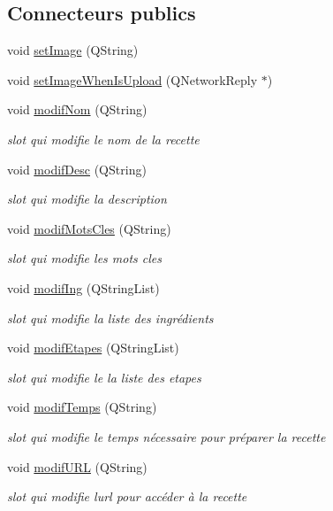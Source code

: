 \subsection*{Connecteurs publics}
\begin{DoxyCompactItemize}
\item 
void \hyperlink{classMainWindow_aaddccbd976fda27cf2d17b9f43dbc486}{set\+Image} (Q\+String)
\item 
void \hyperlink{classMainWindow_ae58368ff237b1f298381a0aeaf8e7290}{set\+Image\+When\+Is\+Upload} (Q\+Network\+Reply $\ast$)
\item 
void \hyperlink{classMainWindow_ac154b320efe8998a85a93f1c41ace7e4}{modif\+Nom} (Q\+String)
\begin{DoxyCompactList}\small\item\em slot qui modifie le nom de la recette \end{DoxyCompactList}\item 
void \hyperlink{classMainWindow_a77ada7a541d869ea7f3647900ba6f6df}{modif\+Desc} (Q\+String)
\begin{DoxyCompactList}\small\item\em slot qui modifie la description \end{DoxyCompactList}\item 
void \hyperlink{classMainWindow_ae9b5aeb3f3b89a40008486d1329a68bc}{modif\+Mots\+Cles} (Q\+String)
\begin{DoxyCompactList}\small\item\em slot qui modifie les mots cles \end{DoxyCompactList}\item 
void \hyperlink{classMainWindow_a64a5116401b4a54c55c6a7d34fc7ec93}{modif\+Ing} (Q\+String\+List)
\begin{DoxyCompactList}\small\item\em slot qui modifie la liste des ingrédients \end{DoxyCompactList}\item 
void \hyperlink{classMainWindow_a1a85241ab332ebb026638ff0a6df83e0}{modif\+Etapes} (Q\+String\+List)
\begin{DoxyCompactList}\small\item\em slot qui modifie le la liste des etapes \end{DoxyCompactList}\item 
void \hyperlink{classMainWindow_ab49cf9603a1a539ca19623eac88b86c2}{modif\+Temps} (Q\+String)
\begin{DoxyCompactList}\small\item\em slot qui modifie le temps nécessaire pour préparer la recette \end{DoxyCompactList}\item 
void \hyperlink{classMainWindow_a3620273f0e53b380d70df636400e8519}{modif\+U\+RL} (Q\+String)
\begin{DoxyCompactList}\small\item\em slot qui modifie l\textquotesingle{}url pour accéder à la recette \end{DoxyCompactList}\end{DoxyCompactItemize}
